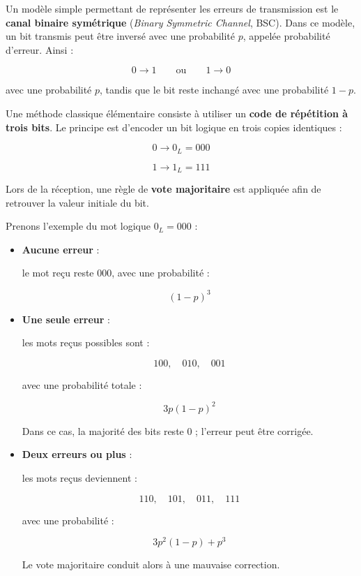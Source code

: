 \documentclass[a4paper,12pt]{article}
\begin{document}
Un modèle simple permettant de représenter les erreurs de transmission est le \textbf{canal binaire symétrique} (\textit{Binary Symmetric Channel}, BSC). Dans ce modèle, un bit transmis peut être inversé avec une probabilité $p$, appelée probabilité d’erreur. Ainsi :

\[
0 \longrightarrow 1
\qquad
\text{ou}
\qquad
1 \longrightarrow 0
\]

avec une probabilité $p$, tandis que le bit reste inchangé avec une probabilité $1-p$.

Une méthode classique élémentaire consiste à utiliser un \textbf{code de répétition à trois bits}. Le principe est d’encoder un bit logique en trois copies identiques :

\[
0 \longrightarrow 0_L = 000
\]

\[
1 \longrightarrow 1_L = 111
\]

Lors de la réception, une règle de \textbf{vote majoritaire} est appliquée afin de retrouver la valeur initiale du bit.

Prenons l’exemple du mot logique $0_L = 000$ :

\begin{itemize}
    \item \textbf{Aucune erreur} :
    
    le mot reçu reste $000$, avec une probabilité :
    
    \[
    (1-p)^3
    \]

    \item \textbf{Une seule erreur} :
    
    les mots reçus possibles sont :
    
    \[
    100,\quad010,\quad001
    \]
    
    avec une probabilité totale :
    
    \[
    3p(1-p)^2
    \]

    Dans ce cas, la majorité des bits reste $0$ ; l’erreur peut être corrigée.

    \item \textbf{Deux erreurs ou plus} :
    
    les mots reçus deviennent :
    
    \[
    110,\quad101,\quad011,\quad111
    \]

    avec une probabilité :

    \[
    3p^2(1-p)+p^3
    \]

    Le vote majoritaire conduit alors à une mauvaise correction.
\end{itemize}
\end{document}
